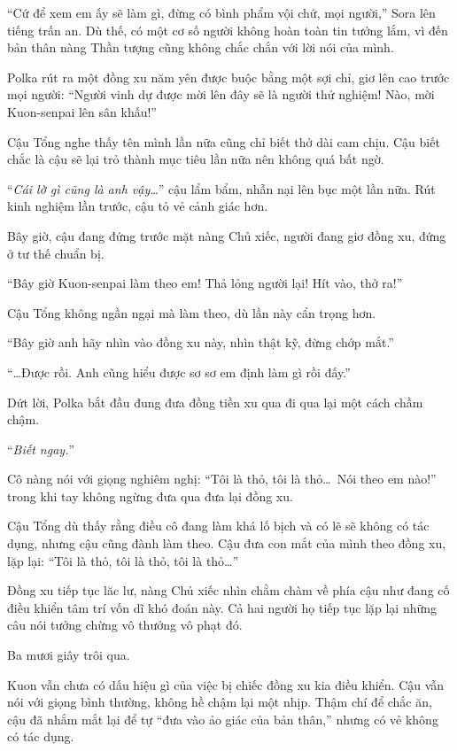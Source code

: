 \documentclass[../main.tex]{subfiles}
\begin{document}
``Cứ để xem em ấy sẽ làm gì, đừng có bình phẩm vội chứ, mọi người,'' Sora lên tiếng trấn an. Dù thế, có một cơ số người không hoàn toàn tin tưởng lắm, vì đến bản thân nàng Thần tượng cũng không chắc chắn với lời nói của mình.

Polka rút ra một đồng xu năm yên được buộc bằng một sợi chỉ, giơ lên cao trước mọi người: ``Người vinh dự được mời lên đây sẽ là người thử nghiệm! Nào, mời Kuon-senpai lên sân khấu!''

Cậu Tổng nghe thấy tên mình lần nữa cũng chỉ biết thở dài cam chịu. Cậu biết chắc là cậu sẽ lại trỏ thành mục tiêu lần nữa nên không quá bất ngờ.

``\textit{Cái lờ gì cũng là anh vậy\dots}'' cậu lẩm bẩm, nhẫn nại lên bục một lần nữa. Rút kinh nghiệm lần trước, cậu tỏ vẻ cảnh giác hơn.

Bây giờ, cậu đang đứng trước mặt nàng Chủ xiếc, người đang giơ đồng xu, đứng ở tư thế chuẩn bị.

``Bây giờ Kuon-senpai làm theo em! Thả lỏng người lại! Hít vào, thở ra!''

Cậu Tổng không ngần ngại mà làm theo, dù lần này cẩn trọng hơn.

``Bây giờ anh hãy nhìn vào đồng xu này, nhìn thật kỹ, đừng chớp mắt.''

``\dots Được rồi. Anh cũng hiểu được sơ sơ em định làm gì rồi đấy.''

Dứt lời, Polka bắt đầu đung đưa đồng tiền xu qua đi qua lại một cách chầm chậm.

``\textit{Biết ngay.}''

Cô nàng nói với giọng nghiêm nghị: ``Tôi là thỏ, tôi là thỏ\dots\ Nói theo em nào!'' trong khi tay không ngừng đưa qua đưa lại đồng xu.

Cậu Tổng dù thấy rằng điều cô đang làm khá lố bịch và có lẽ sẽ không có tác dụng, nhưng cậu cũng đành làm theo. Cậu đưa con mắt của mình theo đồng xu, lặp lại: ``Tôi là thỏ, tôi là thỏ, tôi là thỏ\dots''

Đồng xu tiếp tục lăc lư, nàng Chủ xiếc nhìn chằm chàm về phía cậu như đang cố điều khiển tâm trí vốn dĩ khó đoán này. Cả hai người họ tiếp tục lặp lại những câu nói tưởng chừng vô thưởng vô phạt đó.

Ba mươi giây trôi qua.

Kuon vẫn chưa có dấu hiệu gì của việc bị chiếc đồng xu kia điều khiển. Cậu vẫn nói với giọng bình thường, không hề chậm lại một nhịp. Thậm chí để chắc ăn, cậu đã nhắm mắt lại để tự ``đưa vào ảo giác của bản thân,'' nhưng có vẻ không có tác dụng.
\end{document}
